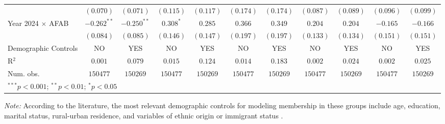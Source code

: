 \begin{table}[htpb]
{\begin{tabular}{l c c c c c c c c c c}
                        & $(0.070)$     & $(0.071)$     & $(0.115)$      & $(0.117)$      & $(0.174)$    & $(0.174)$     & $(0.087)$ & $(0.089)$ & $(0.096)$ & $(0.099)$ \\
Year 2024 $\times$ AFAB & $-0.262^{**}$ & $-0.250^{**}$ & $0.308^{*}$    & $0.285$        & $0.366$      & $0.349$       & $0.204$   & $0.204$   & $-0.165$  & $-0.166$  \\
                        & $(0.084)$     & $(0.085)$     & $(0.146)$      & $(0.147)$      & $(0.197)$    & $(0.197)$     & $(0.133)$ & $(0.134)$ & $(0.151)$ & $(0.151)$ \\
\hline
Demographic Controls    & NO            & YES           & NO             & YES            & NO           & YES           & NO        & YES       & NO        & YES       \\
R$^2$                   & $0.001$       & $0.079$       & $0.015$        & $0.124$        & $0.014$      & $0.183$       & $0.002$   & $0.024$   & $0.002$   & $0.025$   \\
Num. obs.               & $150477$      & $150269$      & $150477$       & $150269$       & $150477$     & $150269$      & $150477$  & $150269$  & $150477$  & $150269$  \\
\hline
\multicolumn{11}{l}{\scriptsize{$^{***}p<0.001$; $^{**}p<0.01$; $^{*}p<0.05$}}
\hline
\multicolumn{11}{l}{\scriptsize{$^{***}p<0.001$; $^{**}p<0.01$; $^{*}p<0.05$}} \\
\end{tabular}
}
\vspace{1ex}
\raggedright
\footnotesize\textit{Note:} According to the literature, the most relevant demographic controls for modeling membership in these groups include age, education, marital status, rural-urban residence, and variables of ethnic origin or immigrant status \citep{Badgettetal2021, Carpenteretal2020}.
\end{table}
